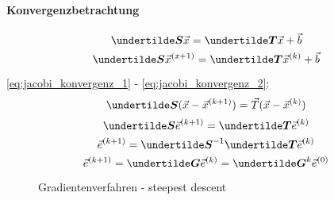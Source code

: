 \paragraph{Konvergenzbetrachtung}
\begin{equation}
\ma{S} \vec{x} = \ma{T} \vec{x} + \vec{b}
\label{eq:jacobi_konvergenz_1}
\end{equation}
\begin{equation}
\ma{S} \vec{x}^{(x + 1)} = \ma{T} \vec{x}^{(k)} + \vec{b}
\label{eq:jacobi_konvergenz_2}
\end{equation}

\ref{eq:jacobi_konvergenz_1} - \ref{eq:jacobi_konvergenz_2}:
\[\ma{S} (\vec{x} - \vec{x}^{(k + 1)}) = \vec{T} (\vec{x} - \vec{x}^{(k)})\]
\[\ma{S} \vec{e}^{(k + 1)} = \ma{T} \vec{e}^{(k)}\]
\[\vec{e}^{(k + 1)} = \ma{S}^{-1} \ma{T} \vec{e}^{(k)}\]
\[\vec{e}^{(k + 1)} = \ma{G} \vec{e}^{(k)} = \ma{G}^k \vec{e}^{(0)}\]

\begin{figure}[htdp]
	\center
	
	\caption{Gradientenverfahren - steepest descent}
\end{figure}